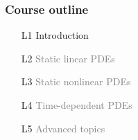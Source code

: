 \begin{frame}
  \frametitle{Course outline}

  \begin{enumerate}
  \item[L1]
    Introduction
  \item[L2]
    \textcolor{grey}{Static linear PDEs}
  \item[L3]
    \textcolor{grey}{Static nonlinear PDEs}
  \item[L4]
    \textcolor{grey}{Time-dependent PDEs}
  \item[L5]
    \textcolor{grey}{Advanced topics}
  \end{enumerate}

\end{frame}
